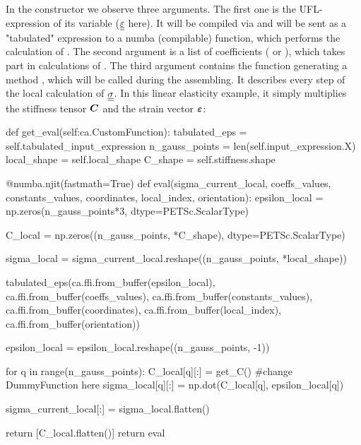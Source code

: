 \documentclass[12pt]{article}
\begin{document}
In the  constructor we observe three arguments. The first one is the UFL-expression of its variable ($\underline{\underline{\varepsilon}}$ here). It will be compiled via  and will be sent as a "tabulated" expression to a numba (compilable) function, which performs the calculation of . The second argument is a list of  coefficients ( or ), which takes part in calculations of . The third argument contains the function  generating a  method , which will be called during the assembling. It describes every step of the local calculation of $\underline{\underline{\sigma}}$. In this linear elasticity example, it simply multiplies the stiffness tensor $\mbox{\boldmath $C$}$ and the strain vector $\mbox{\boldmath $\varepsilon$}$:

\begin{pythoncode}
    def get_eval(self:ca.CustomFunction):
        tabulated_eps = self.tabulated_input_expression
        n_gauss_points = len(self.input_expression.X)
        local_shape = self.local_shape
        C_shape = self.stiffness.shape

        @numba.njit(fastmath=True)
        def eval(sigma_current_local, coeffs_values, constants_values, coordinates, local_index, orientation):
            epsilon_local = np.zeros(n_gauss_points*3, dtype=PETSc.ScalarType)

            C_local = np.zeros((n_gauss_points, *C_shape), dtype=PETSc.ScalarType)
            
            sigma_local = sigma_current_local.reshape((n_gauss_points, *local_shape))

            tabulated_eps(ca.ffi.from_buffer(epsilon_local), 
                        ca.ffi.from_buffer(coeffs_values), 
                        ca.ffi.from_buffer(constants_values), 
                        ca.ffi.from_buffer(coordinates), ca.ffi.from_buffer(local_index), ca.ffi.from_buffer(orientation))
            
            epsilon_local = epsilon_local.reshape((n_gauss_points, -1))

            for q in range(n_gauss_points):
                C_local[q][:] = get_C() #change DummyFunction here
                sigma_local[q][:] = np.dot(C_local[q], epsilon_local[q]) 
            
            sigma_current_local[:] = sigma_local.flatten()

            
            return [C_local.flatten()]
        return eval
\end{pythoncode}
\end{document}
